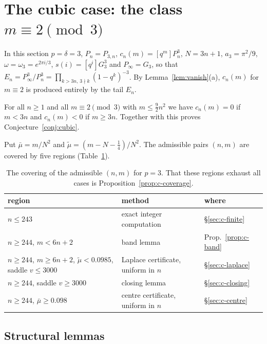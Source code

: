 \section{The cubic case: the class \texorpdfstring{$m\equiv2\pmod 3$}{m = 2 mod 3}}\label{sec:cubic}

In this section $p=\delta=3$, $P_n=P_{3,n}$, $c_n(m)=[q^m]P_n^3$, $N=3n+1$, $a_3=\pi^2/9$, $\omega=\omega_3=e^{2\pi i/3}$,
$s(i)=[q^i]G_3^3$ and $P_\infty=G_3$, so that $E_n=P_\infty^3/P_n^3=\prod_{k>3n,\,3\nmid k}(1-q^k)^{-3}$. By
Lemma~\ref{lem:vanish}(a), $c_n(m)$ for $m\equiv2$ is produced entirely by the tail $E_n$.

\begin{theorem}\label{thm:cubic-main}
For all $n\ge1$ and all $m\equiv2\pmod3$ with $m\le\frac92n^2$ we have $c_n(m)=0$ if $m<3n$ and $c_n(m)<0$ if $m\ge3n$.
Together with \cite{WK} this proves Conjecture~\ref{conj:cubic}.
\end{theorem}

Put $\bar\mu=m/N^2$ and $\tilde\mu=(m-N-\frac14)/N^2$. The admissible pairs $(n,m)$ are covered by five regions
(Table~\ref{tab:regions3}).

\begin{table}[h]
\centering
\small
\begin{tabular}{lll}
\toprule
region & method & where\\
\midrule
$n\le243$ & exact integer computation & \S\ref{sec:c-finite}\\
$n\ge244$, $m<6n+2$ & band lemma & Prop.~\ref{prop:c-band}\\
$n\ge244$, $m\ge 6n+2$, $\tilde\mu<0.0985$, saddle $v\le3000$ & Laplace certificate, uniform in $n$ & \S\ref{sec:c-laplace}\\
$n\ge244$, saddle $v\ge3000$ & closing lemma & \S\ref{sec:c-closing}\\
$n\ge244$, $\bar\mu\ge0.098$ & centre certificate, uniform in $n$ & \S\ref{sec:c-centre}\\
\bottomrule
\end{tabular}
\caption{The covering of the admissible $(n,m)$ for $p=3$. That these regions exhaust all cases is
Proposition~\ref{prop:c-coverage}.}
\label{tab:regions3}
\end{table}

\subsection{Structural lemmas}\label{sec:c-structural}

